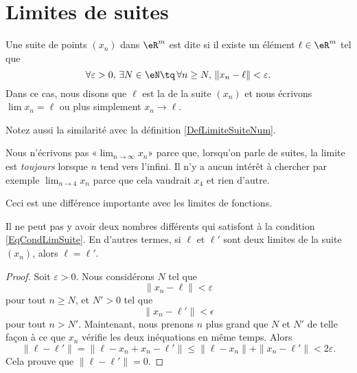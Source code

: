 \section{Limites de suites}

\begin{definition}
	Une suite de points $(x_n)$ dans $\eR^m$ est dite  si il existe un élément $\ell\in\eR^m$ tel que
	\begin{equation}	\label{EqCondLimSuite}
		\forall\varepsilon>0,\,\exists N\in \eN\tq\,\forall n\geq N,\,\| x_n-\ell \|<\varepsilon.
	\end{equation}
	Dans ce cas, nous disons que $\ell$ est la  de la suite $(x_n)$ et nous écrivons $\lim x_n=\ell$ ou plus simplement $x_n\to \ell$.
\end{definition}
Notez aussi la similarité avec la définition \ref{DefLimiteSuiteNum}.

\begin{remark}
	Nous n'écrivons pas «$\lim_{n\to\infty}x_n$» parce que, lorsqu'on parle de suites, la limite est \emph{toujours} lorsque $n$ tend vers l'infini. Il n'y a aucun intérêt à chercher par exemple $\lim_{n\to 4}x_n$ parce que cela vaudrait $x_4$ et rien d'autre.

	Ceci est une différence importante avec les limites de fonctions.
\end{remark}

\begin{lemma}
	Il ne peut pas y avoir deux nombres différents qui satisfont à la condition \eqref{EqCondLimSuite}. En d'autres termes, si $\ell$ et $\ell'$ sont deux limites de la suite $(x_n)$, alors $\ell=\ell'$.
\end{lemma}

\begin{proof}
	Soit $\varepsilon>0$. Nous considérons $N$ tel que
	\begin{equation}
		\| x_n-\ell \|<\varepsilon
	\end{equation}
	pour tout $n\geq N$, et $N'>0$ tel que 
	\begin{equation}
		\| x_n-\ell' \|<\epsilon
	\end{equation}
	pour tout $n>N'$. Maintenant, nous prenons $n$ plus grand que $N$ et $N'$ de telle façon à ce que $x_n$ vérifie les deux inéquations en même temps. Alors
	\begin{equation}
		\| \ell-\ell' \|=\| \ell-x_n+x_n-\ell' \|\leq\| \ell-x_n \|+\| x_n-\ell' \|<2\varepsilon.
	\end{equation}
	Cela prouve que $\| \ell-\ell' \|=0$.
\end{proof}


